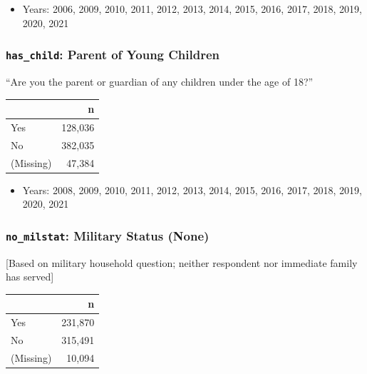 \documentclass[10pt,article,oneside]{memoir}
\theoremstyle{definition}
\begin{document}
\begin{itemize}
\tightlist
\item
  Years: 2006, 2009, 2010, 2011, 2012, 2013, 2014, 2015, 2016, 2017,
  2018, 2019, 2020, 2021
\end{itemize}

\hypertarget{has_child-parent-of-young-children}{%
\subsubsection{\texorpdfstring{\texttt{has\_child}: Parent of Young
Children}{has\_child: Parent of Young Children}}\label{has_child-parent-of-young-children}}

``Are you the parent or guardian of any children under the age of 18?''

\begin{table}[H]
\centering
\begin{tabular}[t]{lr}
\toprule
 & n\\
\midrule
Yes & 128,036\\
No & 382,035\\
(Missing) & 47,384\\
\bottomrule
\end{tabular}
\end{table}

\begin{itemize}
\tightlist
\item
  Years: 2008, 2009, 2010, 2011, 2012, 2013, 2014, 2015, 2016, 2017,
  2018, 2019, 2020, 2021
\end{itemize}

\hypertarget{no_milstat-military-status-none}{%
\subsubsection{\texorpdfstring{\texttt{no\_milstat}: Military Status
(None)}{no\_milstat: Military Status (None)}}\label{no_milstat-military-status-none}}

{[}Based on military household question; neither respondent nor
immediate family has served{]}

\begin{table}[H]
\centering
\begin{tabular}[t]{lr}
\toprule
 & n\\
\midrule
Yes & 231,870\\
No & 315,491\\
(Missing) & 10,094\\
\bottomrule
\end{tabular}
\end{table}
\end{document}
